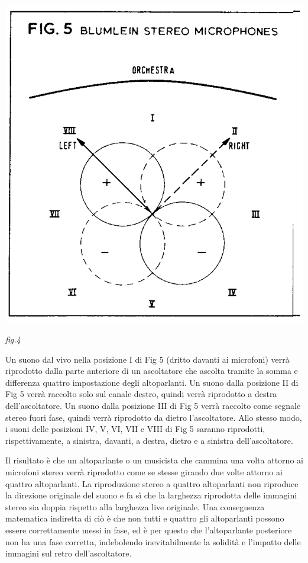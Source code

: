 \documentclass[11pt]{article}
\begin{document}
\begin{multicols*}{2}
\begin{center}
\includegraphics[scale=0.43]{images/fig_05.png}

{\scriptsize \emph{fig.4}}
\end{center}

Un suono dal vivo nella posizione I di Fig 5 (dritto davanti ai microfoni) verrà riprodotto dalla parte anteriore di un ascoltatore che ascolta tramite la somma e differenza quattro
impostazione degli altoparlanti. Un suono dalla posizione II di Fig 5 verrà raccolto solo sul canale destro, quindi verrà riprodotto a destra dell'ascoltatore. Un suono dalla posizione III di Fig 5 verrà raccolto come segnale stereo fuori fase, quindi verrà riprodotto da dietro l'ascoltatore. Allo stesso modo, i suoni delle posizioni IV, V, VI, VII e VIII di Fig 5 saranno riprodotti, rispettivamente, a sinistra, davanti, a destra, dietro e a sinistra dell’ascoltatore.

Il risultato è che un altoparlante o un musicista che cammina una volta attorno ai microfoni stereo verrà riprodotto come se stesse girando due volte attorno ai quattro altoparlanti. La riproduzione stereo a quattro altoparlanti non riproduce la direzione originale del suono e fa sì che la larghezza riprodotta delle immagini stereo sia doppia rispetto alla larghezza live originale. Una conseguenza matematica indiretta di ciò è che non tutti e quattro gli altoparlanti possono essere correttamente messi in fase, ed è per questo che l'altoparlante posteriore non ha una fase corretta, indebolendo inevitabilmente la solidità e l'impatto delle immagini sul retro dell’ascoltatore.


\end{multicols*}
\end{document}
